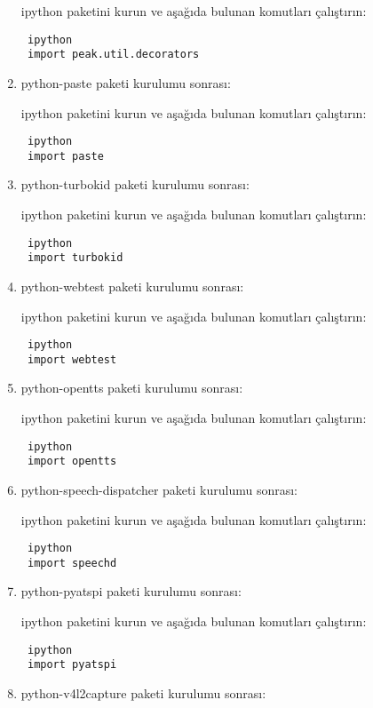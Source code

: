 \documentclass[a4paper,10pt]{article}
\begin{document}
\begin{enumerate}
ipython paketini kurun ve aşağıda bulunan komutları çalıştırın:
\begin{verbatim}
 ipython
 import peak.util.decorators
\end{verbatim}

\item python-paste paketi kurulumu sonrası:

ipython paketini kurun ve aşağıda bulunan komutları çalıştırın:
\begin{verbatim}
 ipython
 import paste
\end{verbatim}

\item python-turbokid paketi kurulumu sonrası:

ipython paketini kurun ve aşağıda bulunan komutları çalıştırın:
\begin{verbatim}
 ipython
 import turbokid
\end{verbatim}

\item python-webtest paketi kurulumu sonrası:

ipython paketini kurun ve aşağıda bulunan komutları çalıştırın:
\begin{verbatim}
 ipython
 import webtest
\end{verbatim}


\item python-opentts paketi kurulumu sonrası:

ipython paketini kurun ve aşağıda bulunan komutları çalıştırın:
\begin{verbatim}
 ipython
 import opentts
\end{verbatim}

\item python-speech-dispatcher paketi kurulumu sonrası:

ipython paketini kurun ve aşağıda bulunan komutları çalıştırın:
\begin{verbatim}
 ipython
 import speechd
\end{verbatim}

\item python-pyatspi paketi kurulumu sonrası:

ipython paketini kurun ve aşağıda bulunan komutları çalıştırın:
\begin{verbatim}
 ipython
 import pyatspi
\end{verbatim}

\item python-v4l2capture paketi kurulumu sonrası:


\end{enumerate}
\end{document}
